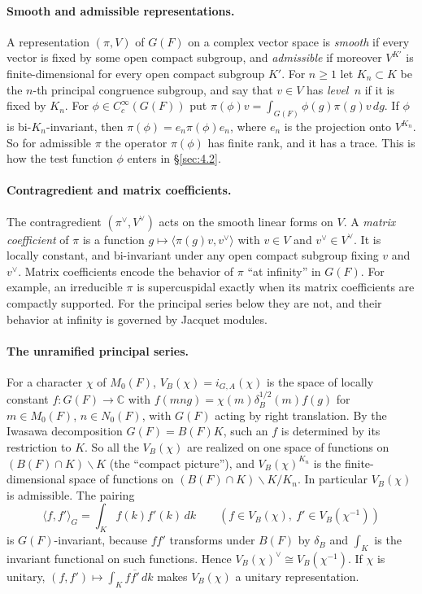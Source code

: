 \documentclass[12pt,letterpaper]{article}
\numberwithin{equation}{section}
\theoremstyle{plain}
\theoremstyle{remark}
\theoremstyle{plain}
\theoremstyle{definition}
\theoremstyle{remark}
\theoremstyle{remark}
\newcommand{\ip}[1]{\langle #1\rangle}
\begin{document}
\paragraph{Smooth and admissible representations.} A representation $(\pi,V)$ of $G(F)$ on a complex vector space is \emph{smooth} if every vector is fixed by some open compact subgroup, and \emph{admissible} if moreover $V^{K'}$ is finite-dimensional for every open compact subgroup $K'$. For $n\ge1$ let $K_n\subset K$ be the $n$-th principal congruence subgroup, and say that $v\in V$ has \emph{level~$n$} if it is fixed by $K_n$. For $\phi\in C_c^\infty(G(F))$ put $\pi(\phi)v=\int_{G(F)}\phi(g)\pi(g)v\,dg$. If $\phi$ is bi-$K_n$-invariant, then $\pi(\phi)=e_n\pi(\phi)e_n$, where $e_n$ is the projection onto $V^{K_n}$. So for admissible $\pi$ the operator $\pi(\phi)$ has finite rank, and it has a trace. This is how the test function $\phi$ enters in \S\ref{sec:4.2}.

\paragraph{Contragredient and matrix coefficients.} The contragredient $(\pi^\vee,V^\vee)$ acts on the smooth linear forms on $V$. A \emph{matrix coefficient} of $\pi$ is a function $g\mapsto\ip{\pi(g)v,v^\vee}$ with $v\in V$ and $v^\vee\in V^\vee$. It is locally constant, and bi-invariant under any open compact subgroup fixing $v$ and $v^\vee$. Matrix coefficients encode the behavior of $\pi$ ``at infinity'' in $G(F)$. For example, an irreducible $\pi$ is supercuspidal exactly when its matrix coefficients are compactly supported. For the principal series below they are not, and their behavior at infinity is governed by Jacquet modules.

\paragraph{The unramified principal series.} For a character $\chi$ of $M_0(F)$, $V_B(\chi)=i_{G,A}(\chi)$ is the space of locally constant $f:G(F)\to\mathbb{C}$ with $f(mng)=\chi(m)\delta_B^{1/2}(m)f(g)$ for $m\in M_0(F)$, $n\in N_0(F)$, with $G(F)$ acting by right translation. By the Iwasawa decomposition $G(F)=B(F)K$, such an $f$ is determined by its restriction to $K$. So all the $V_B(\chi)$ are realized on one space of functions on $(B(F)\cap K)\backslash K$ (the ``compact picture''), and $V_B(\chi)^{K_n}$ is the finite-dimensional space of functions on $(B(F)\cap K)\backslash K/K_n$. In particular $V_B(\chi)$ is admissible. The pairing
\[
\ip{f,f'}_G=\int_Kf(k)f'(k)\,dk\qquad(f\in V_B(\chi),\ f'\in V_B(\chi^{-1}))
\]
is $G(F)$-invariant, because $ff'$ transforms under $B(F)$ by $\delta_B$ and $\int_K$ is the invariant functional on such functions. Hence $V_B(\chi)^\vee\cong V_B(\chi^{-1})$. If $\chi$ is unitary, $(f,f')\mapsto\int_Kf\overline{f'}\,dk$ makes $V_B(\chi)$ a unitary representation.
\end{document}
